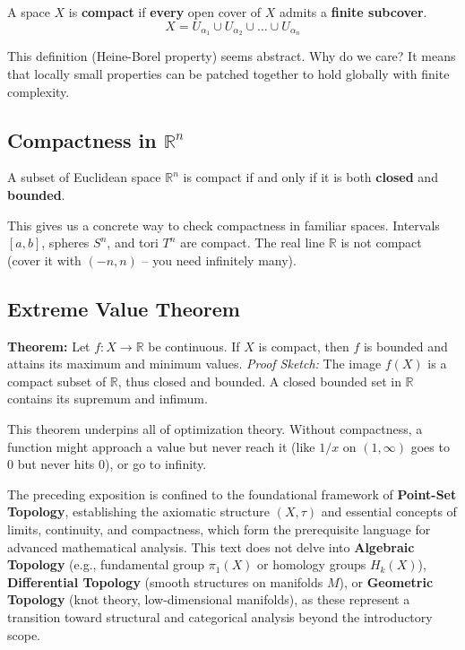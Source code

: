 \documentclass[oneside]{book}
\begin{document}
\begin{definition}
A space $X$ is \textbf{compact} if \textbf{every} open cover of $X$ admits a \textbf{finite subcover}.
\[ X = U_{\alpha_1} \cup U_{\alpha_2} \cup \dots \cup U_{\alpha_n} \]
\end{definition}
This definition (Heine-Borel property) seems abstract. Why do we care?
It means that locally small properties can be patched together to hold globally with finite complexity.

\subsection{Compactness in $\mathbb{R}^n$}
\begin{theorem}
A subset of Euclidean space $\mathbb{R}^n$ is compact if and only if it is both \textbf{closed} and \textbf{bounded}.
\end{theorem}
This gives us a concrete way to check compactness in familiar spaces. Intervals $[a, b]$, spheres $S^n$, and tori $T^n$ are compact. The real line $\mathbb{R}$ is not compact (cover it with $(-n, n)$ -- you need infinitely many).

\subsection{Extreme Value Theorem}
\textbf{Theorem:} Let $f: X \to \mathbb{R}$ be continuous. If $X$ is compact, then $f$ is bounded and attains its maximum and minimum values.
\textit{Proof Sketch:} The image $f(X)$ is a compact subset of $\mathbb{R}$, thus closed and bounded. A closed bounded set in $\mathbb{R}$ contains its supremum and infimum.

This theorem underpins all of optimization theory. Without compactness, a function might approach a value but never reach it (like $1/x$ on $(1, \infty)$ goes to 0 but never hits 0), or go to infinity.

The preceding exposition is confined to the foundational framework of \textbf{Point-Set Topology}, establishing the axiomatic structure $(X,\tau)$ and essential concepts of limits, continuity, and compactness, which form the prerequisite language for advanced mathematical analysis. This text does not delve into \textbf{Algebraic Topology} (e.g., fundamental group $\pi_1(X)$ or homology groups $H_k(X)$), \textbf{Differential Topology} (smooth structures on manifolds $M$), or \textbf{Geometric Topology} (knot theory, low-dimensional manifolds), as these represent a transition toward structural and categorical analysis beyond the introductory scope.
\end{document}
